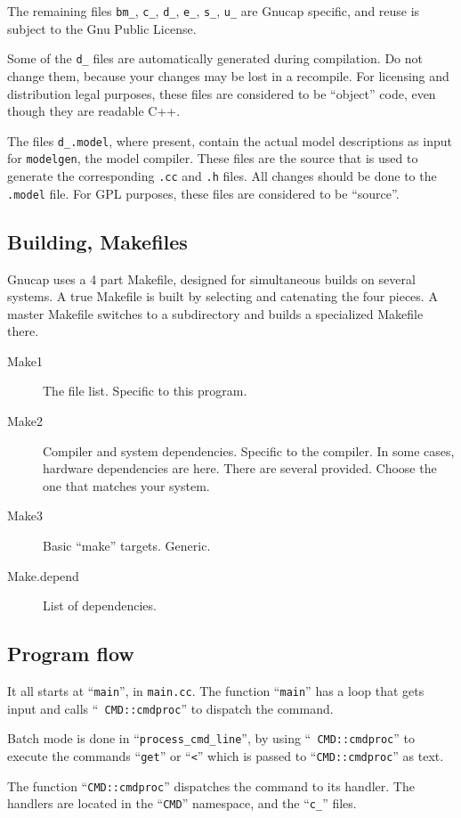 The remaining files {\tt bm\_\*}, {\tt c\_\*}, {\tt d\_\*}, {\tt e\_\*},
{\tt s\_\*}, {\tt u\_\*} are Gnucap specific, and reuse is subject to the
Gnu Public License.

Some of the {\tt d\_\*} files are automatically generated during
compilation.  Do not change them, because your changes may be lost in
a recompile.  For licensing and distribution legal purposes, these
files are considered to be ``object'' code, even though they are
readable C++.

The files {\tt d\_\*.model}, where present, contain the actual model
descriptions as input for {\tt modelgen}, the model compiler.
These files are the source that is used to generate the corresponding
{\tt .cc} and {\tt .h} files.  All changes should be done to the {\tt
.model} file.  For GPL purposes, these files are considered to be
``source''.
\subsection{Building, Makefiles}

Gnucap uses a 4 part Makefile, designed for simultaneous builds on
several systems.  A true Makefile is built by selecting and catenating
the four pieces.  A master Makefile switches to a subdirectory and
builds a specialized Makefile there.

\begin{description}
\item[Make1] The file list.  Specific to this program.
\item[Make2] Compiler and system dependencies.  Specific to the
  compiler.  In some cases, hardware dependencies are here.  There are
  several provided.  Choose the one that matches your system.
\item[Make3] Basic ``make'' targets.  Generic.
\item[Make.depend] List of dependencies.
\end{description}
\subsection{Program flow}

It all starts at ``{\tt main}'', in {\tt main.cc}.  The function
``{\tt main}'' has a loop that gets input and calls ``{\tt
  CMD::cmdproc}'' to dispatch the command.

Batch mode is done in ``{\tt process\_cmd\_line}'', by using ``{\tt
  CMD::cmdproc}'' to execute the commands ``{\tt get}'' or ``{\tt <}''
which is passed to ``{\tt CMD::cmdproc}'' as text.

The function ``{\tt CMD::cmdproc}'' dispatches the command to its
handler.  The handlers are located in the ``{\tt CMD}'' namespace, and
the ``{\tt c\_\*}'' files.
